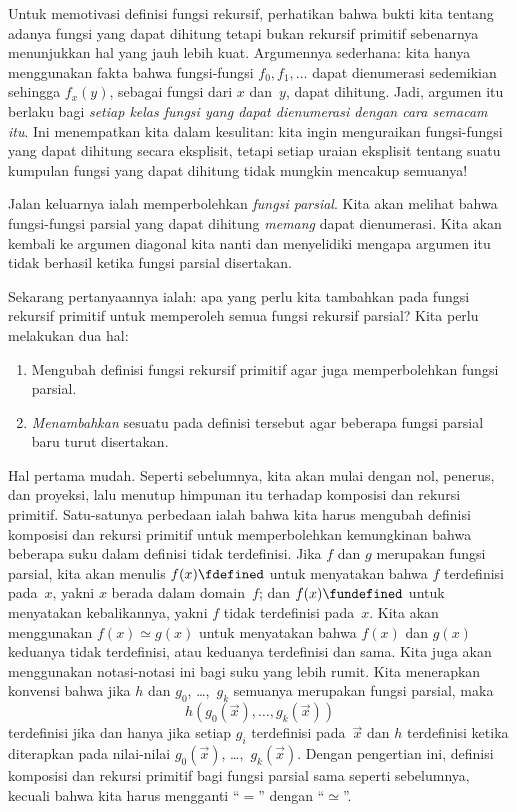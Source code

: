 \documentclass[../../../include/open-logic-section]{subfiles}
\begin{document}

Untuk memotivasi definisi fungsi rekursif, perhatikan bahwa bukti kita tentang
adanya fungsi yang dapat dihitung tetapi bukan rekursif primitif sebenarnya
menunjukkan hal yang jauh lebih kuat. Argumennya sederhana: kita hanya
menggunakan fakta bahwa fungsi-fungsi $f_0,f_1,\dots$ dapat dienumerasi
sedemikian sehingga $f_x(y)$, sebagai fungsi dari $x$ dan~$y$, dapat dihitung.
Jadi, argumen itu berlaku bagi \emph{setiap kelas fungsi yang dapat dienumerasi
dengan cara semacam itu}. Ini menempatkan kita dalam kesulitan: kita ingin
menguraikan fungsi-fungsi yang dapat dihitung secara eksplisit, tetapi setiap
uraian eksplisit tentang suatu kumpulan fungsi yang dapat dihitung tidak mungkin
mencakup semuanya!

Jalan keluarnya ialah memperbolehkan \emph{fungsi parsial}. Kita akan melihat
bahwa fungsi-fungsi parsial yang dapat dihitung \emph{memang} dapat dienumerasi.
 Kita akan
kembali ke argumen diagonal kita nanti dan menyelidiki mengapa argumen itu
tidak berhasil ketika fungsi parsial disertakan.

Sekarang pertanyaannya ialah: apa yang perlu kita tambahkan pada fungsi
rekursif primitif untuk memperoleh semua fungsi rekursif parsial? Kita perlu
melakukan dua hal:
\begin{enumerate}
\item Mengubah definisi fungsi rekursif primitif agar juga memperbolehkan
  fungsi parsial.
\item \emph{Menambahkan} sesuatu pada definisi tersebut agar beberapa fungsi
  parsial baru turut disertakan.
\end{enumerate}

Hal pertama mudah. Seperti sebelumnya, kita akan mulai dengan nol, penerus,
dan proyeksi, lalu menutup himpunan itu terhadap komposisi dan rekursi
primitif. Satu-satunya perbedaan ialah bahwa kita harus mengubah definisi
komposisi dan rekursi primitif untuk memperbolehkan kemungkinan bahwa beberapa
suku dalam definisi tidak terdefinisi. Jika $f$ dan $g$ merupakan fungsi
parsial, kita akan menulis $f(x) \fdefined$ untuk menyatakan bahwa $f$
terdefinisi pada~$x$, yakni $x$ berada dalam domain~$f$; dan $f(x)
\fundefined$ untuk menyatakan kebalikannya, yakni $f$ tidak terdefinisi
pada~$x$. Kita akan menggunakan $f(x)\simeq g(x)$ untuk menyatakan bahwa
$f(x)$ dan $g(x)$ keduanya tidak terdefinisi, atau keduanya terdefinisi dan
sama. Kita juga akan menggunakan notasi-notasi ini bagi suku yang lebih
rumit. Kita menerapkan konvensi bahwa jika $h$ dan $g_0$, \dots,~$g_k$
semuanya merupakan fungsi parsial, maka
\[
h(g_0(\vec x),\dots,g_k(\vec x))
\]
terdefinisi jika dan hanya jika setiap $g_i$ terdefinisi pada~$\vec x$ dan
$h$ terdefinisi ketika diterapkan pada nilai-nilai
$g_0(\vec x)$, \dots,~$g_k(\vec x)$. Dengan pengertian ini, definisi
komposisi dan rekursi primitif bagi fungsi parsial sama seperti sebelumnya,
kecuali bahwa kita harus mengganti ``$=$'' dengan ``$\simeq$''.
\end{document}
